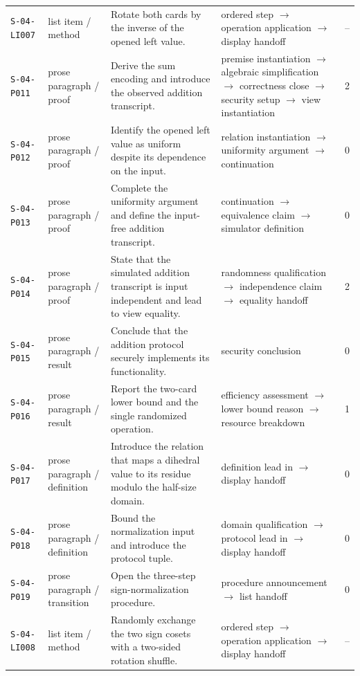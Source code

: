 \documentclass[10pt]{article}
\begin{document}
\begin{longtable}{@{}p{}p{}p{}p{}p{}@{}}
\texttt{S-04-LI007}&list item / method&Rotate both cards by the inverse of the opened left value.&ordered step $\rightarrow$ operation application $\rightarrow$ display handoff&--\\
\texttt{S-04-P011}&prose paragraph / proof&Derive the sum encoding and introduce the observed addition transcript.&premise instantiation $\rightarrow$ algebraic simplification $\rightarrow$ correctness close $\rightarrow$ security setup $\rightarrow$ view instantiation&2\\
\texttt{S-04-P012}&prose paragraph / proof&Identify the opened left value as uniform despite its dependence on the input.&relation instantiation $\rightarrow$ uniformity argument $\rightarrow$ continuation&0\\
\texttt{S-04-P013}&prose paragraph / proof&Complete the uniformity argument and define the input-free addition transcript.&continuation $\rightarrow$ equivalence claim $\rightarrow$ simulator definition&0\\
\texttt{S-04-P014}&prose paragraph / proof&State that the simulated addition transcript is input independent and lead to view equality.&randomness qualification $\rightarrow$ independence claim $\rightarrow$ equality handoff&2\\
\texttt{S-04-P015}&prose paragraph / result&Conclude that the addition protocol securely implements its functionality.&security conclusion&0\\
\texttt{S-04-P016}&prose paragraph / result&Report the two-card lower bound and the single randomized operation.&efficiency assessment $\rightarrow$ lower bound reason $\rightarrow$ resource breakdown&1\\
\texttt{S-04-P017}&prose paragraph / definition&Introduce the relation that maps a dihedral value to its residue modulo the half-size domain.&definition lead in $\rightarrow$ display handoff&0\\
\texttt{S-04-P018}&prose paragraph / definition&Bound the normalization input and introduce the protocol tuple.&domain qualification $\rightarrow$ protocol lead in $\rightarrow$ display handoff&0\\
\texttt{S-04-P019}&prose paragraph / transition&Open the three-step sign-normalization procedure.&procedure announcement $\rightarrow$ list handoff&0\\
\texttt{S-04-LI008}&list item / method&Randomly exchange the two sign cosets with a two-sided rotation shuffle.&ordered step $\rightarrow$ operation application $\rightarrow$ display handoff&--\\

\end{longtable}
\end{document}
